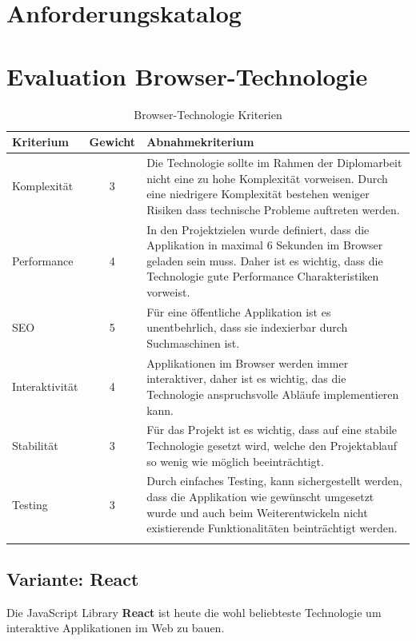 \clearpage
\section{Anforderungskatalog}\label{anforderungskatalog}



\clearpage
\section{Evaluation Browser-Technologie}\label{evaluation-browser-technologie}

\begin{longtable}[]{@{}p{2cm}cp{10cm}@{}}
  \toprule
  \textbf{Kriterium} & \textbf{Gewicht} & \textbf{Abnahmekriterium}\tabularnewline
  \midrule
  \endhead
  Komplexität        & 3                & Die Technologie sollte im Rahmen der Diplomarbeit nicht eine zu hohe Komplexität vorweisen. Durch eine niedrigere Komplexität bestehen weniger Risiken dass technische Probleme auftreten werden.\tabularnewline
  \midrule
  Performance        & 4                & In den Projektzielen wurde definiert, dass die Applikation in maximal 6 Sekunden im Browser geladen sein muss. Daher ist es wichtig, dass die Technologie gute Performance Charakteristiken vorweist.\tabularnewline
  \midrule
  SEO                & 5                & Für eine öffentliche Applikation ist es unentbehrlich, dass sie indexierbar durch Suchmaschinen ist.\tabularnewline
  \midrule
  Interaktivität     & 4                & Applikationen im Browser werden immer interaktiver, daher ist es wichtig, das die Technologie anspruchsvolle Abläufe implementieren kann. \tabularnewline
  \midrule
  Stabilität         & 3                & Für das Projekt ist es wichtig, dass auf eine stabile Technologie gesetzt wird, welche den Projektablauf so wenig wie möglich beeinträchtigt. \tabularnewline
  \midrule
  Testing            & 3                & Durch einfaches Testing, kann sichergestellt werden, dass die Applikation wie gewünscht umgesetzt wurde und auch beim Weiterentwickeln nicht existierende Funktionalitäten beinträchtigt werden.\tabularnewline
  \bottomrule
  \caption{Browser-Technologie Kriterien}
\end{longtable}

\subsection{Variante: React}

Die JavaScript Library \textbf{React} ist heute die wohl beliebteste
Technologie um interaktive Applikationen im Web zu bauen.

